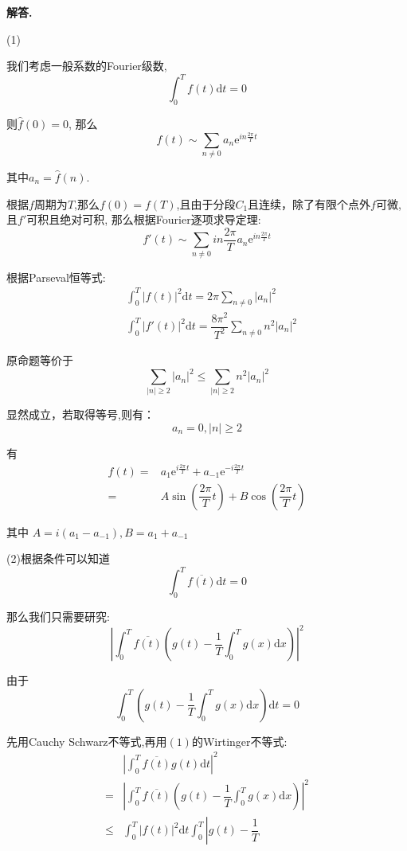 \documentclass[12pt, a4paper, oneside]{ctexart}
\newenvironment{solution}{\par\noindent\textbf{解答. }}{\par}
\begin{document}
\begin{solution}
\par
(1)
\par
我们考虑一般系数的Fourier级数,
$$
\int_{0}^{T}f(t)\mathrm{d}t=0
$$
\par
则$\hat{f}(0)=0$, 那么
$$
f(t)\sim \sum_{n \ne 0}a_n\mathrm{e}^{in\frac{2\pi}{T}t}
$$
\par
其中$a_n=\hat{f}(n)$.
\par
根据$f$周期为$T$,那么$f(0)=f(T)$,且由于分段$C_1$且连续，除了有限个点外$f$可微,
且$f'$可积且绝对可积,
那么根据Fourier逐项求导定理:
$$
f'(t)\sim \sum_{n \ne 0}in\dfrac{2\pi}{T}a_n\mathrm{e}^{in\frac{2\pi}{T}t} 
$$
\par
根据Parseval恒等式:
$$
\begin{aligned}
&\int_{0}^{T}|f(t)|^2\mathrm{d}t=2\pi\sum_{n \ne 0}|a_n|^2\\
&\int_{0}^{T}|f'(t)|^2\mathrm{d}t=\dfrac{8\pi^2}{T^2}\sum_{n \ne 0}n^2|a_n|^2
\end{aligned}
$$
\par
原命题等价于
$$
\sum_{|n|\geqslant 2}|a_n|^2\leqslant \sum_{|n| \geqslant 2}n^2|a_n|^2
$$
\par
显然成立，若取得等号,则有：
$$
a_n=0, |n|\geqslant 2
$$
\par
有$$
\begin{aligned}
f(t)
=&a_1\mathrm{e}^{i\frac{2\pi}{T}t}+a_{-1}\mathrm{e}^{-i\frac{2\pi}{T}t}\\
=&A\sin \left(\dfrac{2\pi}{T}t\right)+B\cos \left(\dfrac{2\pi}{T}t\right)
\end{aligned}
$$
\par
其中
$A=i(a_1-a_{-1}),B=a_1+a_{-1}$
\par
(2)根据条件可以知道$$
\int_{0}^{T}\overline{f(t)}\mathrm{d}t=0
$$
\par
那么我们只需要研究:
$$
\left|\int_{0}^{T}\overline{f(t)}\left(g(t)-\dfrac{1}{T}\int_{0}^{T}g(x)\mathrm{d}x\right)\right|^2
$$
\par
由于
$$
\int_{0}^{T}\left(g(t)-\dfrac{1}{T}\int_{0}^{T}g(x)\mathrm{d}x\right)\mathrm{d}t=0
$$
\par
先用Cauchy Schwarz不等式,再用$(1)$的Wirtinger不等式:
$$
\begin{aligned}
&\left|\int_{0}^{T}\overline{f(t)}g(t)\mathrm{d}t\right|^2\\
=&\left|\int_{0}^{T}\overline{f(t)}\left(g(t)-\dfrac{1}{T}\int_{0}^{T}g(x)\mathrm{d}x\right)\right|^2\\
\leqslant& \int_{0}^{T}|f(t)|^2\mathrm{d}t\int_{0}^{T}\left|g(t)-\dfrac{1}{T}

\end{aligned}$$
\end{solution}
\end{document}

